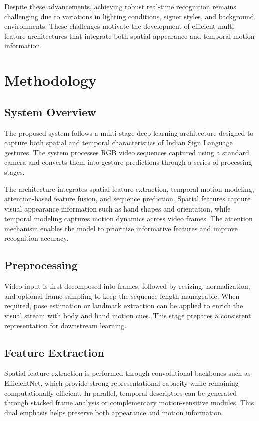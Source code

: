 \documentclass[runningheads]{llncs}
\begin{document}
Despite these advancements, achieving robust real-time recognition remains challenging due to variations in lighting conditions, signer styles, and background environments. These challenges motivate the development of efficient multi-feature architectures that integrate both spatial appearance and temporal motion information.

\section{Methodology}
\subsection{System Overview}
The proposed system follows a multi-stage deep learning architecture designed to capture both spatial and temporal characteristics of Indian Sign Language gestures. The system processes RGB video sequences captured using a standard camera and converts them into gesture predictions through a series of processing stages.

The architecture integrates spatial feature extraction, temporal motion modeling, attention-based feature fusion, and sequence prediction. Spatial features capture visual appearance information such as hand shapes and orientation, while temporal modeling captures motion dynamics across video frames. The attention mechanism enables the model to prioritize informative features and improve recognition accuracy.

\subsection{Preprocessing}
Video input is first decomposed into frames, followed by resizing, normalization, and optional frame sampling to keep the sequence length manageable. When required, pose estimation or landmark extraction can be applied to enrich the visual stream with body and hand motion cues. This stage prepares a consistent representation for downstream learning.

\subsection{Feature Extraction}
Spatial feature extraction is performed through convolutional backbones such as EfficientNet, which provide strong representational capacity while remaining computationally efficient. In parallel, temporal descriptors can be generated through stacked frame analysis or complementary motion-sensitive modules. This dual emphasis helps preserve both appearance and motion information.
\end{document}
